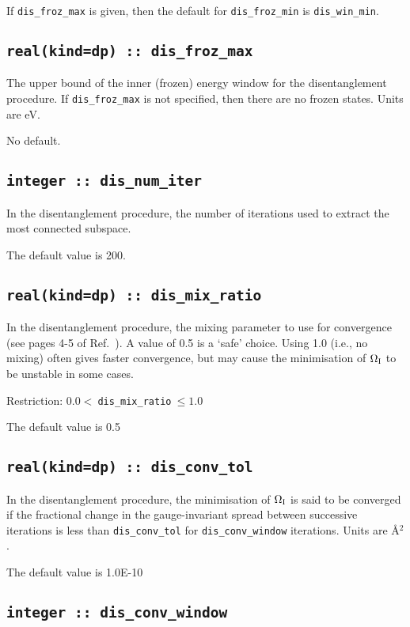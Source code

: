 If \verb#dis_froz_max# is given, then the default for
\verb#dis_froz_min# is \verb#dis_win_min#.


\subsection[dis\_froz\_max]{\tt real(kind=dp) :: dis\_froz\_max}
The upper bound of the inner (frozen) energy window for the
disentanglement procedure. If \verb#dis_froz_max# is not specified,
then there are no frozen states. Units are eV.

No default.

\subsection[dis\_num\_iter]{\tt integer :: dis\_num\_iter}
In the disentanglement procedure, the
number of iterations used to extract the most connected subspace.

The default value is 200.

\subsection[dis\_mix\_ratio]{\tt real(kind=dp) :: dis\_mix\_ratio}
In the disentanglement procedure, the mixing parameter to use for
convergence (see pages 4-5 of Ref.~\cite{souza-prb01}). A value of 0.5
is a `safe' choice. Using 1.0 (i.e., no mixing) often gives faster
convergence, but may cause the minimisation of $\Omega_{\mathrm{I}}$ to be unstable
in some cases.

Restriction: $0.0<\:${\tt dis\_mix\_ratio}$\:\leq 1.0$

The default value is 0.5

\subsection[dis\_conv\_tol]{\tt real(kind=dp) :: dis\_conv\_tol}

In the disentanglement procedure, the minimisation of $\Omega_{\mathrm{I}}$ is said
to be converged if the fractional change in the gauge-invariant spread
between successive iterations is less than
\verb#dis_conv_tol# for \verb#dis_conv_window# iterations. Units are \AA$^2$.

The default value is 1.0E-10


\subsection[dis\_conv\_window]{\tt integer :: dis\_conv\_window}

